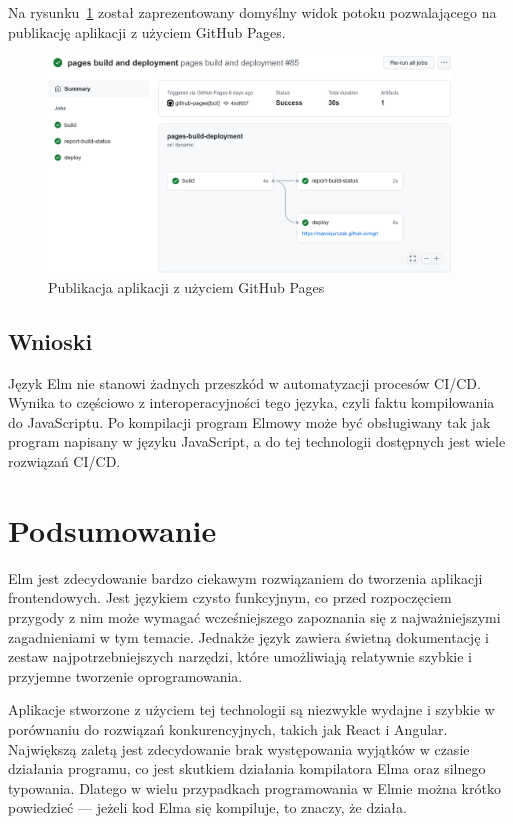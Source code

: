 \documentclass[twoside,a4paper]{report}
\begin{document}
Na rysunku~\ref{fig:deploy_yml} został zaprezentowany domyślny widok potoku pozwalającego na publikację aplikacji z użyciem GitHub Pages.
\begin{figure}[H]
    \centering
    \includegraphics[width=0.95\textwidth]{img/deploy_yml.png}
    \caption{Publikacja aplikacji z użyciem GitHub Pages}\label{fig:deploy_yml}
\end{figure}

\section{Wnioski}
Język Elm nie stanowi żadnych przeszkód w automatyzacji procesów CI/CD\@.
Wynika to częściowo z interoperacyjności tego języka, czyli faktu kompilowania do JavaScriptu.
Po kompilacji program Elmowy może być obsługiwany tak jak program napisany w języku JavaScript, a do tej technologii dostępnych jest wiele rozwiązań CI/CD\@.


\chapter{Podsumowanie}
Elm jest zdecydowanie bardzo ciekawym rozwiązaniem do tworzenia aplikacji frontendowych.
Jest językiem czysto funkcyjnym, co przed rozpoczęciem przygody z nim może wymagać wcześniejszego zapoznania się z najważniejszymi zagadnieniami w tym temacie.
Jednakże język zawiera świetną dokumentację i zestaw najpotrzebniejszych narzędzi, które umożliwiają relatywnie szybkie i przyjemne tworzenie oprogramowania.

Aplikacje stworzone z użyciem tej technologii są niezwykle wydajne i szybkie w porównaniu do rozwiązań konkurencyjnych, takich jak React i Angular.
Największą zaletą jest zdecydowanie brak występowania wyjątków w czasie działania programu, co jest skutkiem działania kompilatora Elma oraz silnego typowania.
Dlatego w wielu przypadkach programowania w Elmie można krótko powiedzieć --- jeżeli kod Elma się kompiluje, to znaczy, że działa.
\end{document}
